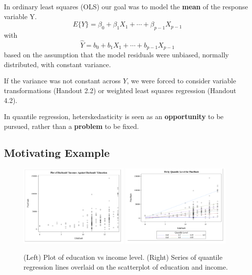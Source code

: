 \documentclass[12pt]{../notes}
\begin{document}
In ordinary least squares (OLS) our goal was to model the \textbf{mean} of the response variable Y. 
$$E\{Y\} = \beta_0 + \beta_1X_1 + \cdots + \beta_{p-1}X_{p-1}$$
with 
$$\hat{Y} = b_0 + b_1X_1 + \cdots + b_{p-1}X_{p-1}$$
based on the assumption that the model residuals were unbiased, normally distributed, with constant variance. 

\nspace
If the variance was not constant across $Y$, we were forced to consider variable transformations (Handout 2.2) or weighted least squares regression (Handout 4.2). 

\nspace
In quantile regression, heterskedasticity is seen as an \textbf{opportunity} to be pursued, rather than a \textbf{problem} to be fixed. 

\subsection{Motivating Example}

\begin{figure}[H]
\includegraphics[width=0.48\textwidth]{../figures/module7/education_scatter.png}
\includegraphics[width=0.48\textwidth]{../figures/module7/education_scatter_2.png}
\caption{(Left) Plot of education vs income level. (Right) Series of quantile regression lines overlaid on the scatterplot of education and income.}
\label{fig:edscatter}
\end{figure}
\end{document}
